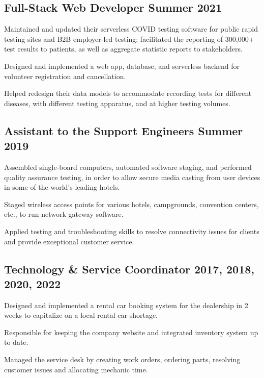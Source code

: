\documentclass[letter,10pt]{article}
\begin{document}
\subsection{{Full-Stack Web Developer \hfill Summer 2021}}
\begin{zitemize}
\item Maintained and updated their serverless COVID testing software for public rapid testing sites and B2B employer-led testing; facilitated the reporting of 300,000+ test results to patients, as well as aggregate statistic reports to stakeholders.
\item Designed and implemented a web app, database, and serverless backend for volunteer registration and cancellation.
\item Helped redesign their data models to accommodate recording tests for different diseases, with different testing apparatus, and at higher testing volumes.
\end{zitemize}

\subsection{{Assistant to the Support Engineers \hfill Summer 2019}}
\begin{zitemize}
\item Assembled single-board computers, automated software staging, and performed quality assurance testing, in order to allow secure media casting from user devices in some of the world's leading hotels.
\item Staged wireless access points for various hotels, campgrounds, convention centers, etc., to run network gateway software.
\item Applied testing and troubleshooting skills to resolve connectivity issues for clients and provide exceptional customer service.
\end{zitemize}

\subsection{{Technology \& Service Coordinator  \hfill 2017, 2018, 2020, 2022}}
\begin{zitemize}
\item Designed and implemented a rental car booking system for the dealership in 2 weeks to capitalize on a local rental car shortage.
\item Responsible for keeping the company website and integrated inventory system up to date.
\item Managed the service desk by creating work orders, ordering parts, resolving customer issues and allocating mechanic time.
\end{zitemize}
\end{document}
